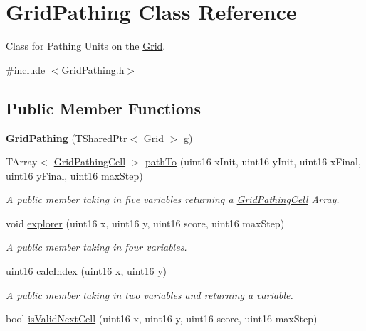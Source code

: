 \hypertarget{class_grid_pathing}{}\section{Grid\+Pathing Class Reference}
\label{class_grid_pathing}


Class for Pathing Units on the \hyperlink{class_grid}{Grid}.  




{\ttfamily \#include $<$Grid\+Pathing.\+h$>$}

\subsection*{Public Member Functions}
\begin{DoxyCompactItemize}
\item 
\hypertarget{class_grid_pathing_a015d8d2d2181c40a11fa2403c47834a8}{}\label{class_grid_pathing_a015d8d2d2181c40a11fa2403c47834a8} 
{\bfseries Grid\+Pathing} (T\+Shared\+Ptr$<$ \hyperlink{class_grid}{Grid} $>$ g)
\item 
T\+Array$<$ \hyperlink{class_grid_pathing_cell}{Grid\+Pathing\+Cell} $>$ \hyperlink{class_grid_pathing_a34564759aeef0f39b6c596163530b51b}{path\+To} (uint16 x\+Init, uint16 y\+Init, uint16 x\+Final, uint16 y\+Final, uint16 max\+Step)
\begin{DoxyCompactList}\small\item\em A public member taking in five variables returning a \hyperlink{class_grid_pathing_cell}{Grid\+Pathing\+Cell} Array. \end{DoxyCompactList}\item 
void \hyperlink{class_grid_pathing_a0d4652be2afba5e6363af1459a8720d2}{explorer} (uint16 x, uint16 y, uint16 score, uint16 max\+Step)
\begin{DoxyCompactList}\small\item\em A public member taking in four variables. \end{DoxyCompactList}\item 
uint16 \hyperlink{class_grid_pathing_aa7d6f9ce481bf8148d778419dfc5947b}{calc\+Index} (uint16 x, uint16 y)
\begin{DoxyCompactList}\small\item\em A public member taking in two variables and returning a variable. \end{DoxyCompactList}\item 
bool \hyperlink{class_grid_pathing_a97cdae33476da7638fbcd45fc0595eb9}{is\+Valid\+Next\+Cell} (uint16 x, uint16 y, uint16 score, uint16 max\+Step)

\end{DoxyCompactItemize}
